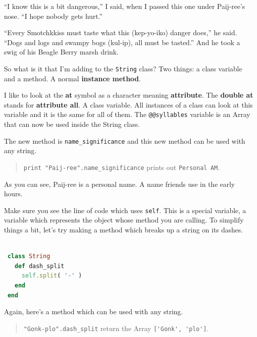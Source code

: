 \documentclass[10pt,twoside]{report}
\begin{document}
``I know this is a bit dangerous,'' I said, when I passed this one
under Paij-ree's nose. ``I hope nobody gets hurt.''

``Every Smotchkkiss must taste what this (kep-yo-iko) danger does,''
he said.  ``Dogs and logs and swampy bogs (kul-ip), all must be
tasted.''  And he took a swig of his Beagle Berry marsh drink.

So what is it that I'm adding to the
\lstinline[breaklines=true]|String| class?  Two things: a class
variable and a method.  A normal {\bf instance method}.

I like to look at the {\bf at} symbol as a character meaning {\bf
  attribute}.  The {\bf double at} stands for {\bf attribute all}.  A
class variable.  All instances of a class can look at this variable
and it is the same for all of them.  The
\lstinline[breaklines=true]|@@syllables| variable is an Array that can
now be used inside the String class.

The new method is \lstinline[breaklines=true]|name_significance| and
this new method can be used with any string.

\begin{quote}
\lstinline[breaklines=true]|print "Paij-ree".name_significance| prints
out \lstinline[breaklines=true]|Personal AM|.\end{quote}


As you can see, Paij-ree is a personal name.  A name friends use in
the early hours.

Make sure you see the line of code which uses
\lstinline[breaklines=true]|self|.  This is a special variable, a
variable which represents the object whose method you are calling.  To
simplify things a bit, let's try making a method which breaks up a
string on its dashes.


\begin{lstlisting}[basicstyle=\ttfamily\color{basiccolor},
    commentstyle = \ttfamily\color{commentcolor},
    keywordstyle=\ttfamily\color{keywordscolor},
    stringstyle=\color{stringcolor},
    language=Ruby,
    basicstyle=\small\ttfamily,
    showstringspaces=false,
  ]

 class String
   def dash_split
     self.split( '-' )
   end
 end

\end{lstlisting}


Again, here's a method which can be used with any string.

\begin{quote}
\lstinline[breaklines=true]|"Gonk-plo".dash_split| return the Array
\lstinline[breaklines=true]|['Gonk', 'plo']|.\end{quote}
\end{document}
